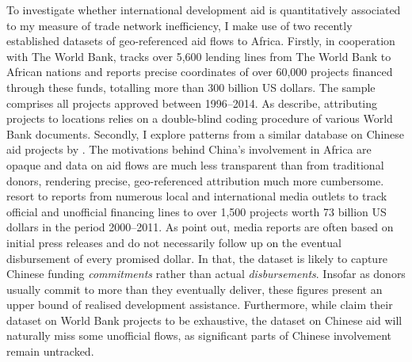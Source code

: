\documentclass[11pt, oneside]{article}   	%
\begin{document}
To investigate whether international development aid is quantitatively associated to my measure of trade network inefficiency, I make use of two recently established datasets of geo-referenced aid flows to Africa. Firstly,  \cite{AidData_WorldBankGeocoded_2017} in cooperation with The World Bank, tracks over 5,600 lending lines from The World Bank to African nations and reports precise coordinates of over 60,000 projects financed through these funds, totalling more than 300 billion US dollars. The sample comprises all projects approved between 1996--2014. As \cite{Strandow_UCDPAidDataCodebook_2011} describe, attributing projects to locations relies on a double-blind coding procedure of various World Bank documents. Secondly, I explore patterns from a  similar database on Chinese aid projects by \cite{Strange_TrackingUnderreportedFinancial_2017}. The motivations behind China's involvement in Africa are opaque and data on aid flows are much less transparent than from traditional donors, rendering precise, geo-referenced attribution much more cumbersome. \citeauthor{Strange_TrackingUnderreportedFinancial_2017} resort to reports from numerous local and international media outlets to track official and unofficial financing lines to over 1,500 projects worth 73 billion US dollars in the period 2000--2011. As \citeauthor{Strange_TrackingUnderreportedFinancial_2017} point out, media reports are often based on initial press releases and do not necessarily follow up on the eventual disbursement of every promised dollar. In that, the dataset is likely to capture Chinese funding \emph{commitments} rather than actual \emph{disbursements}. Insofar as donors usually commit to more than they eventually deliver, these figures present an upper bound of realised development assistance. Furthermore, while \cite{AidData_WorldBankGeocoded_2017} claim their dataset on World Bank projects to be exhaustive, the dataset on Chinese aid will naturally miss some unofficial flows, as significant parts of Chinese involvement remain untracked.
\end{document}
